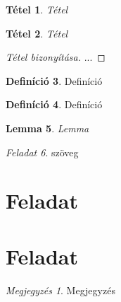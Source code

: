 \documentclass{article}
\theoremstyle{plain}\newtheorem{tet}{Tétel}
\theoremstyle{definition}\newtheorem{defin}[tet]{Definíció}
\theoremstyle{plain}\newtheorem{lemma}[tet]{Lemma}
\theoremstyle{remark}\newtheorem{fel}[tet]{Feladat}
\newtheorem*{megjegy}{Megjegyzés}
\begin{document}
\begin{tet}

Tétel
\end{tet}

\begin{tet}

Tétel
\end{tet}

\begin{proof}[Tétel bizonyítása]
...
\end{proof}

\begin{defin}

Definíció 

\end{defin}

\begin{defin}

Definíció 

\end{defin}

\begin{lemma}
Lemma
\end{lemma}

\begin{fel}
szöveg


\end{fel}
\section{Feladat}

\section{Feladat}
\begin{megjegy}
Megjegyzés
\end{megjegy}
\end{document}
